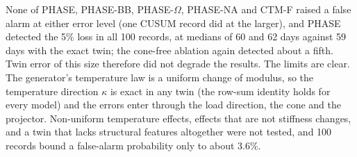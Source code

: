 \documentclass[12pt,a4paper]{article}
\newenvironment{revblock}{}{}
\newenvironment{revblock}{\begingroup\color{revcol}}{\endgroup}
\begin{document}
\begin{revblock}
None of PHASE, PHASE-BB, PHASE-$\Omega$, PHASE-NA and CTM-F raised a false alarm at either error level (one CUSUM record did at the larger), and PHASE detected the 5\% loss in all 100 records, at medians of 60 and 62 days against 59 days with the exact twin; the cone-free ablation again detected about a fifth. Twin error of this size therefore did not degrade the results. The limits are clear. The generator's temperature law is a uniform change of modulus, so the temperature direction $\kappa$ is exact in any twin (the row-sum identity holds for every model) and the errors enter through the load direction, the cone and the projector. Non-uniform temperature effects, effects that are not stiffness changes, and a twin that lacks structural features altogether were not tested, and 100 records bound a false-alarm probability only to about 3.6\%.
\end{revblock}
\end{document}
